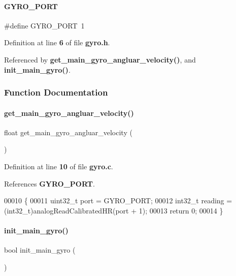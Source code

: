 \paragraph{G\+Y\+R\+O\+\_\+\+P\+O\+RT}
{\footnotesize\ttfamily \#define G\+Y\+R\+O\+\_\+\+P\+O\+RT~1}



Definition at line \textbf{ 6} of file \textbf{ gyro.\+h}.



Referenced by \textbf{ get\+\_\+main\+\_\+gyro\+\_\+angluar\+\_\+velocity()}, and \textbf{ init\+\_\+main\+\_\+gyro()}.



\subsubsection{Function Documentation}
\mbox{\label{a00020_aec0963ebe3eb6cdfd7edaf486bbb0a87}} 
\paragraph{get\+\_\+main\+\_\+gyro\+\_\+angluar\+\_\+velocity()}
{\footnotesize\ttfamily float get\+\_\+main\+\_\+gyro\+\_\+angluar\+\_\+velocity (\begin{DoxyParamCaption}{ }\end{DoxyParamCaption})}



Definition at line \textbf{ 10} of file \textbf{ gyro.\+c}.



References \textbf{ G\+Y\+R\+O\+\_\+\+P\+O\+RT}.


\begin{DoxyCode}
00010                                        \{
00011   uint32\_t port = GYRO_PORT;
00012   int32\_t reading = (int32\_t)analogReadCalibratedHR(port + 1);
00013   \textcolor{keywordflow}{return} 0;
00014 \}
\end{DoxyCode}
\mbox{\label{a00020_a47c0a78a867be91a28e278bf433d699c}} 
\paragraph{init\+\_\+main\+\_\+gyro()}
{\footnotesize\ttfamily bool init\+\_\+main\+\_\+gyro (\begin{DoxyParamCaption}{ }\end{DoxyParamCaption})}



